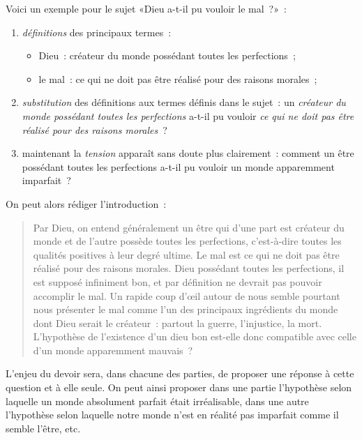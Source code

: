 \documentclass[a4paper,11pt]{article}
\begin{document}
\par

Voici un exemple pour le sujet «Dieu a-t-il pu vouloir le mal~?»~:
\begin{enumerate}
\item \emph{définitions} des principaux termes~:
  \begin{itemize}
  \item Dieu~: créateur du monde possédant toutes les perfections~;
  \item le mal~: ce qui ne doit pas être réalisé pour des raisons
    morales~;
  \end{itemize}
\item \emph{substitution} des définitions aux termes définis dans le
  sujet~: un \emph{créateur du monde possédant toutes les perfections}
  a-t-il pu vouloir \emph{ce qui ne doit pas être réalisé pour des
    raisons morales}~?
\item maintenant la \emph{tension} apparaît sans doute plus clairement~:
  comment un être possédant toutes les perfections a-t-il pu vouloir un
  monde apparemment imparfait~?
\end{enumerate}

\par

On peut alors rédiger l'introduction~:
\begin{quote}
  Par Dieu, on entend généralement un être qui d'une part est créateur
  du monde et de l'autre possède toutes les perfections, c'est-à-dire
  toutes les qualités positives à leur degré ultime. Le mal est ce qui
  ne doit pas être réalisé pour des raisons morales. Dieu possédant
  toutes les perfections, il est supposé infiniment bon, et par
  définition ne devrait pas pouvoir accomplir le mal. Un rapide coup
  d'œil autour de nous semble pourtant nous présenter le mal comme l'un
  des principaux ingrédients du monde dont Dieu serait le créateur~:
  partout la guerre, l'injustice, la mort. L'hypothèse de l'existence
  d'un dieu bon est-elle donc compatible avec celle d'un monde
  apparemment mauvais~?
\end{quote}
L'enjeu du devoir sera, dans chacune des parties, de proposer une
réponse à cette question et à elle seule. On peut ainsi proposer dans
une partie l'hypothèse selon laquelle un monde absolument parfait était
irréalisable, dans une autre l'hypothèse selon laquelle notre monde
n'est en réalité pas imparfait comme il semble l'être, etc.

\par
\end{document}
